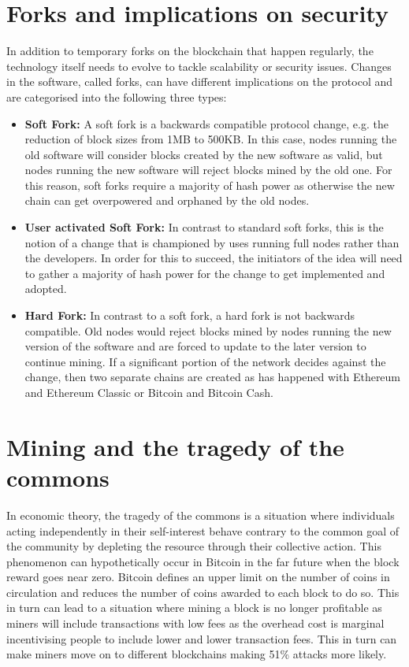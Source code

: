 \documentclass[12pt,msc,a4paper,oneside]{ucl_thesis}
\begin{document}
\section{Forks and implications on security}
In addition to temporary forks on the blockchain that happen regularly, the technology itself needs to evolve to tackle scalability or security issues. Changes in the software, called forks, can have different implications on the protocol and are categorised into the following three types\cite{coindesk:bitcoin_forks}:

\begin{itemize}
    \item\textbf{Soft Fork:} A soft fork is a backwards compatible protocol change, e.g. the reduction of block sizes from 1MB to 500KB. In this case, nodes running the old software will consider blocks created by the new software as valid, but nodes running the new software will reject blocks mined by the old one. For this reason, soft forks require a majority of hash power as otherwise the new chain can get overpowered and orphaned by the old nodes.

    \item\textbf{User activated Soft Fork:} In contrast to standard soft forks, this is the notion of a change that is championed by uses running full nodes rather than the developers. In order for this to succeed, the initiators of the idea will need to gather a majority of hash power for the change to get implemented and adopted.

    \item\textbf{Hard Fork:} In contrast to a soft fork, a hard fork is not backwards compatible. Old nodes would reject blocks mined by nodes running the new version of the software and are forced to update to the later version to continue mining. If a significant portion of the network decides against the change, then two separate chains are created as has happened with Ethereum and Ethereum Classic or Bitcoin and Bitcoin Cash.
\end{itemize}

\section{Mining and the tragedy of the commons}
In economic theory, the tragedy of the commons \cite{wikipedia:tragedy_of_the_commons} is a situation where individuals acting independently in their self-interest behave contrary to the common goal of the community by depleting the resource through their collective action. This phenomenon can hypothetically occur in Bitcoin in the far future when the block reward goes near zero. Bitcoin defines an upper limit on the number of coins in circulation and reduces the number of coins awarded to each block to do so. This in turn can lead to a situation where mining a block is no longer profitable as miners will include transactions with low fees as the overhead cost is marginal incentivising people to include lower and lower transaction fees. This in turn can make miners move on to different blockchains making 51\% attacks more likely.
\end{document}
